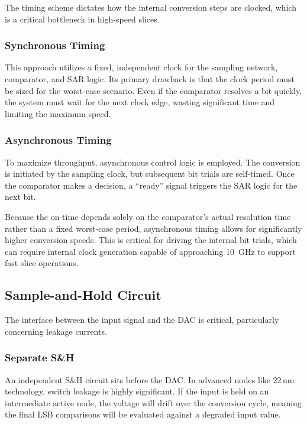 The timing scheme dictates how the internal conversion steps are clocked, which is a critical
bottleneck in high-speed slices.

\subsubsection{Synchronous Timing}

This approach utilizes a fixed, independent clock for the sampling network, comparator, and SAR
logic. Its primary drawback is that the clock period must be sized for the worst-case scenario.
Even if the comparator resolves a bit quickly, the system must wait for the next clock edge,
wasting significant time and limiting the maximum speed.

\subsubsection{Asynchronous Timing}

To maximize throughput, asynchronous control logic is employed. The conversion is initiated by
the sampling clock, but subsequent bit trials are self-timed. Once the comparator makes a
decision, a ``ready'' signal triggers the SAR logic for the next bit.

Because the on-time depends solely on the comparator's actual resolution time rather than a
fixed worst-case period, asynchronous timing allows for significantly higher conversion speeds.
This is critical for driving the internal bit trials, which can require internal clock
generation capable of approaching \SI{10}{GHz} to support fast slice operations.

\subsection{Sample-and-Hold Circuit}

The interface between the input signal and the DAC is critical, particularly concerning leakage
currents.

\subsubsection{Separate S\&H}

An independent S\&H circuit sits before the DAC. In advanced nodes like 22\,nm technology,
switch leakage is highly significant. If the input is held on an intermediate active node, the
voltage will drift over the conversion cycle, meaning the final LSB comparisons will be
evaluated against a degraded input value.

